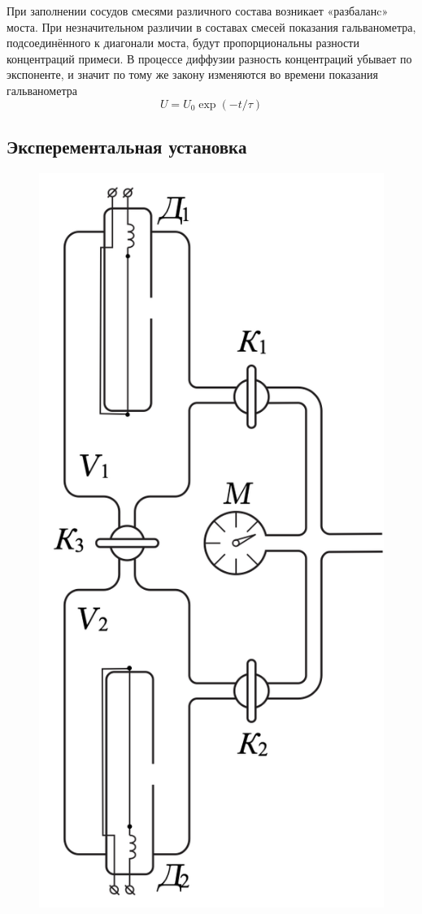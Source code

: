 \documentclass[12pt,a4paper]{article}
\begin{document}
При заполнении сосудов смесями различного состава возникает «разбаланc» моста. При незначительном различии в составах смесей показания гальванометра, подсоединённого к диагонали моста, будут пропорциональны разности концентраций примеси. В процессе диффузии
разность концентраций убывает по экспоненте, и значит по тому же закону изменяются во времени показания гальванометра 
\begin{equation}
	U=U_0 \exp(-t/\tau)
\end{equation}
\subsection*{Эксперементальная установка}
\begin{figure}[htp]
	\centering
	\includegraphics[scale=0.5]{scheme1.png}

\end{figure}
\end{document}
